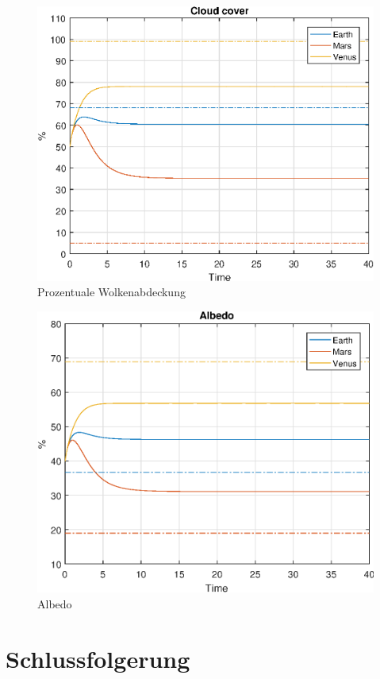 \begin{refsection}
		\begin{figure}
			\center
			\includegraphics[height=0.45\textheight]{planeten/Matlab/figures/cloudCover.eps}
			\caption{Prozentuale Wolkenabdeckung}
		\end{figure}
		
		\begin{figure}
			\center
			\includegraphics[height=0.45\textheight]{planeten/Matlab/figures/albedo.eps}
			\caption{Albedo}
		\end{figure}

\section{Schlussfolgerung}


\end{refsection}
